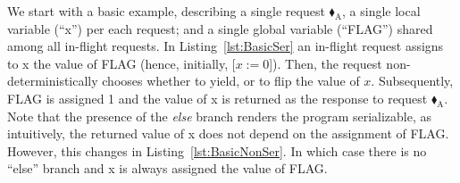 We start with a basic example, describing a single request {\color{ForestGreen}$\blacklozenge_\text{A}$}, a single local variable (``x'') per each request; and a single global variable (``FLAG'') shared among all in-flight requests. 
%
In Listing~\ref{lst:BasicSer} an in-flight request assigns to x the value of FLAG (hence, initially, [$x:=0$]). Then, the request non-deterministically chooses whether to yield, or to flip the value of $x$. Subsequently, FLAG is assigned 1 and the value of x is returned as the response to request {\color{ForestGreen}$\blacklozenge_\text{A}$}. 
%
Note that the presence of the \textit{else} branch renders the program serializable, as intuitively, the returned value of x does not depend on the assignment of FLAG.
%
However, this changes in  Listing~\ref{lst:BasicNonSer}. In which case there is no ``else'' branch and x is always assigned the value of FLAG.

